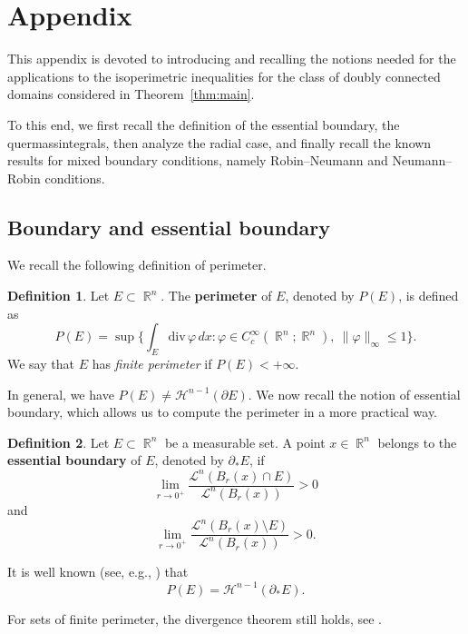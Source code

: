 \documentclass[oneside,a4paper,11pt,notitlepage]{article}
\theoremstyle{plain}
\numberwithin{teor}{section}
\numberwithin{equation}{section}
\theoremstyle{definition}
\newtheorem{defi}[defi]{Definition}
\newenvironment{definizione}{\begin{defi}}{\end{defi}}
\theoremstyle{plain}
\theoremstyle{plain}
\theoremstyle{plain}
\theoremstyle{plain}
\theoremstyle{definition}
\theoremstyle{definition}
\theoremstyle{plain}
\DeclareMathOperator{\R}{\mathbb{R}}
\begin{document}
    


\appendix 
\section{Appendix}\label{app}

This appendix is devoted to introducing and recalling the notions needed for the 
applications to the isoperimetric inequalities for the class of doubly connected 
domains considered in Theorem~\ref{thm:main}. 

To this end, we first recall the definition of the essential boundary, the quermassintegrals, then analyze 
the radial case, and finally recall the known results for mixed boundary conditions, 
namely Robin--Neumann and Neumann--Robin conditions.
\subsection{Boundary and essential boundary}

We recall the following definition of perimeter.

\begin{definizione}
    Let $E \subset \R^n$. The \textbf{perimeter} of $E$, denoted by $P(E)$, is defined as
    \[
        P(E) = \sup \Biggl\{ \int_E \mathrm{div}\, \varphi \, dx : \varphi \in C_c^\infty(\R^n;\R^n), \ \|\varphi\|_\infty \le 1 \Biggr\}.
    \]
    We say that $E$ has \emph{finite perimeter} if $P(E) < +\infty$.
\end{definizione}

In general, we have $P(E) \ne \mathcal{H}^{n-1}(\partial E)$. We now recall the notion of essential boundary, which allows us to compute the perimeter in a more practical way.

\begin{definizione}
    Let $E \subset \R^n$ be a measurable set. A point $x \in \R^n$ belongs to the \textbf{essential boundary} of $E$, denoted by $\partial_\ast E$, if
    \[
        \lim_{r \to 0^+} \frac{\mathcal{L}^n(B_r(x) \cap E)}{\mathcal{L}^n(B_r(x))} > 0
    \]
    and
    \[
        \lim_{r \to 0^+} \frac{\mathcal{L}^n(B_r(x) \setminus E)}{\mathcal{L}^n(B_r(x))} > 0.
    \]
\end{definizione}

It is well known (see, e.g., \cite[Theorem 5.15]{evansgar}) that
\[
    P(E) = \mathcal{H}^{n-1}(\partial_\ast E).
\]

For sets of finite perimeter, the divergence theorem still holds, see \cite[Theorem 5.16]{evansgar}.
\end{document}
